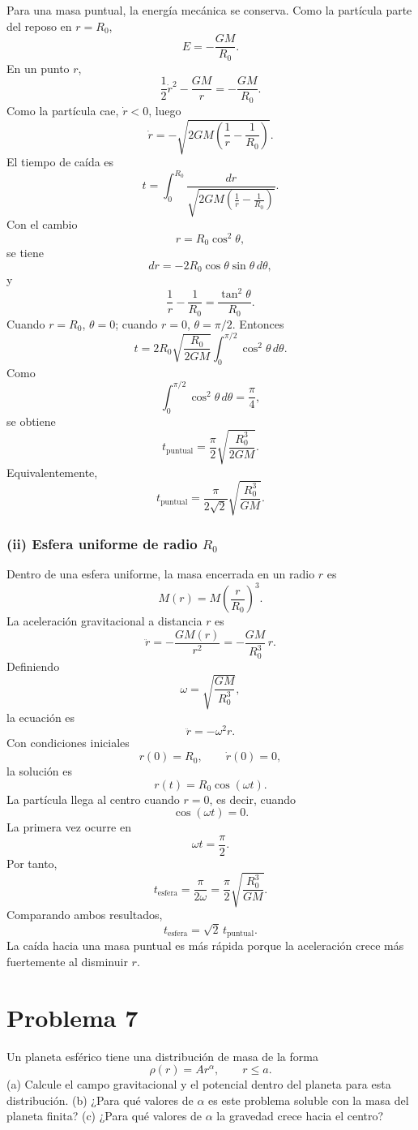 \documentclass[a4paper]{article}
\begin{document}
Para una masa puntual, la energía mecánica se conserva. Como la partícula parte del reposo en $r=R_0$,
$$
E=-\frac{GM}{R_0}.
$$
En un punto $r$,
$$
\frac12 \dot r^2-\frac{GM}{r}=-\frac{GM}{R_0}.
$$
Como la partícula cae, $\dot r<0$, luego
$$
\dot r=-\sqrt{2GM\left(\frac1r-\frac1{R_0}\right)}.
$$
El tiempo de caída es
$$
t=\int_0^{R_0}\frac{dr}{\sqrt{2GM\left(\frac1r-\frac1{R_0}\right)}}.
$$
Con el cambio
$$
r=R_0\cos^2\theta,
$$
se tiene
$$
dr=-2R_0\cos\theta\sin\theta\,d\theta,
$$
y
$$
\frac1r-\frac1{R_0}=\frac{\tan^2\theta}{R_0}.
$$
Cuando $r=R_0$, $\theta=0$; cuando $r=0$, $\theta=\pi/2$. Entonces
$$
t=2R_0\sqrt{\frac{R_0}{2GM}}\int_0^{\pi/2}\cos^2\theta\,d\theta.
$$
Como
$$
\int_0^{\pi/2}\cos^2\theta\,d\theta=\frac{\pi}{4},
$$
se obtiene
$$
t_{\text{puntual}}=\frac{\pi}{2}\sqrt{\frac{R_0^3}{2GM}}.
$$
Equivalentemente,
$$
t_{\text{puntual}}=\frac{\pi}{2\sqrt2}\sqrt{\frac{R_0^3}{GM}}.
$$

\subsubsection{(ii) Esfera uniforme de radio \texorpdfstring{$R_0$}{R0}}

Dentro de una esfera uniforme, la masa encerrada en un radio $r$ es
$$
M(r)=M\left(\frac{r}{R_0}\right)^3.
$$
La aceleración gravitacional a distancia $r$ es
$$
\ddot r=-\frac{G M(r)}{r^2}=-\frac{GM}{R_0^3}\,r.
$$
Definiendo
$$
\omega=\sqrt{\frac{GM}{R_0^3}},
$$
la ecuación es
$$
\ddot r=-\omega^2 r.
$$
Con condiciones iniciales
$$
r(0)=R_0, \qquad \dot r(0)=0,
$$
la solución es
$$
r(t)=R_0\cos(\omega t).
$$
La partícula llega al centro cuando $r=0$, es decir, cuando
$$
\cos(\omega t)=0.
$$
La primera vez ocurre en
$$
\omega t=\frac{\pi}{2}.
$$
Por tanto,
$$
t_{\text{esfera}}=\frac{\pi}{2\omega}=\frac{\pi}{2}\sqrt{\frac{R_0^3}{GM}}.
$$
Comparando ambos resultados,
$$
t_{\text{esfera}}=\sqrt2\,t_{\text{puntual}}.
$$
La caída hacia una masa puntual es más rápida porque la aceleración crece más fuertemente al disminuir $r$.


\section{Problema 7}

Un planeta esférico tiene una distribución de masa de la forma
$$
\rho(r)=A r^\alpha, \qquad r\le a.
$$
(a) Calcule el campo gravitacional y el potencial dentro del planeta para esta distribución.
(b) ¿Para qué valores de $\alpha$ es este problema soluble con la masa del planeta finita?
(c) ¿Para qué valores de $\alpha$ la gravedad crece hacia el centro?
\end{document}
